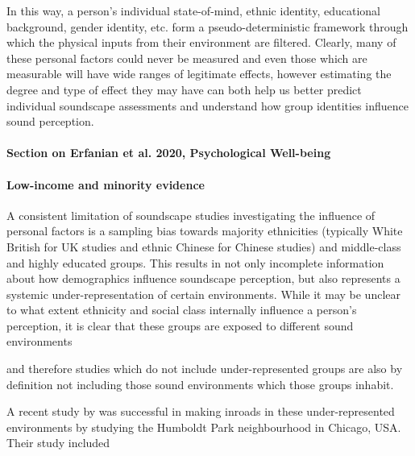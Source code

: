 In this way, a person's individual state-of-mind, ethnic identity, educational background, gender identity, etc. form a pseudo-deterministic framework %
through which the physical inputs from their environment are filtered. Clearly, many of these personal factors could never be measured and even those which are measurable will have wide ranges of legitimate effects, however estimating the degree and type of effect they may have can both help us better predict individual soundscape assessments and understand how group identities influence sound perception.


\paragraph*{Section on Erfanian et al. 2020, Psychological Well-being}

\paragraph*{Low-income and minority evidence} %
A consistent limitation of soundscape studies investigating the influence of personal factors is a sampling bias towards majority ethnicities (typically White British for UK studies and ethnic Chinese for Chinese studies) and middle-class and highly educated groups. %
This results in not only incomplete information about how demographics influence soundscape perception, but also represents a systemic under-representation of certain environments. While it may be unclear to what extent ethnicity and social class internally influence a person's perception, it is clear that these groups are exposed to different sound environments %

and therefore studies which do not include under-represented groups are also by definition not including those sound environments which those groups inhabit.

A recent study by  was successful in making inroads in these under-represented environments by studying the Humboldt Park neighbourhood in Chicago, USA. Their study included


